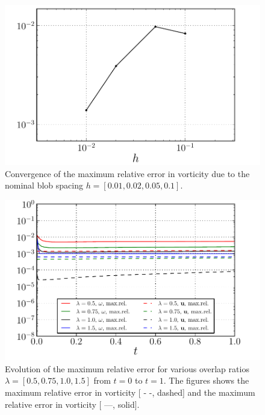 	\begin{figure}[!p]
	\centering
	\includegraphics[width=0.6\linewidth]{./figures/hybrid/lambOseen/lambOseen_parameter_h_Trend.pdf}
	\caption{Convergence of the maximum relative error in vorticity due to the nominal blob spacing $h = [0.01,0.02,0.05,0.1]$.}
	\label{fig:lambOseen_parameter_h_Trend}
	\end{figure}
	
	\begin{figure}[!p]
	\centering
	\includegraphics[width=0.6\linewidth]{./figures/hybrid/lambOseen/lambOseen_parameter_overlap.pdf}
	\caption{Evolution of the maximum relative error for various overlap ratios $\lambda = [0.5, 0.75, 1.0, 1.5]$ from $t=0$ to $t=1$. The figures shows the maximum relative error in vorticity [ - -, dashed] and the maximum relative error in vorticity [ ---, solid].}
	\label{fig:lambOseen_parameter_overlap}
	\end{figure}		

